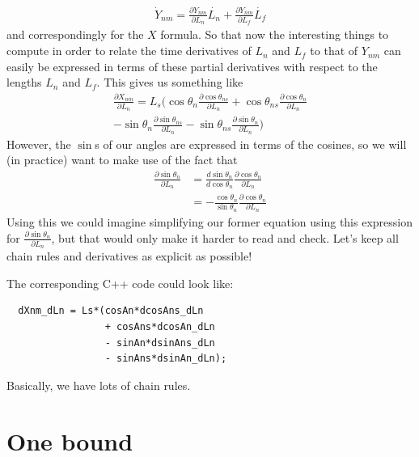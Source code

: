 \documentclass[11pt,twocolumn]{article}
\begin{document}
\begin{align}
  \dot{Y}_{nm} = \frac{\partial Y_{nm}}{\partial L_n} \dot{L_n}
  +  \frac{\partial Y_{nm}}{\partial L_{f}} \dot{L_{f}}
\end{align}
and correspondingly for the $X$ formula.  So that now the interesting
things to compute in order to relate the time derivatives of $L_n$ and
$L_f$ to that of $Y_{nm}$ can easily be expressed in terms of these
partial derivatives with respect to the lengths $L_n$ and $L_f$.  This
gives us something like
\begin{multline}
  \frac{\partial X_{nm}}{\partial L_n} = L_s\Bigg(
  \cos\theta_n\frac{\partial \cos\theta_{ns}}{\partial L_n}
  + \cos\theta_{ns}\frac{\partial \cos\theta_{n}}{\partial L_n} \\
  - \sin\theta_n\frac{\partial \sin\theta_{ns}}{\partial L_n}
  - \sin\theta_{ns}\frac{\partial \sin\theta_{n}}{\partial L_n}
  \Bigg)
\end{multline}
However, the $\sin$s of our angles are expressed in terms of the
cosines, so we will (in practice) want to make use of the fact that
\begin{align}
  \frac{\partial \sin\theta_{n}}{\partial L_n} &=
  \frac{d \sin\theta_{n}}{d \cos\theta_n}
  \frac{\partial \cos\theta_{n}}{\partial L_n} \\
  &=
  -\frac{\cos\theta_{n}}{\sin\theta_n}
  \frac{\partial \cos\theta_{n}}{\partial L_n}
\end{align}
Using this we could imagine simplifying our former equation using this
expression for $\frac{\partial \sin\theta_{n}}{\partial L_n}$, but
that would only make it harder to read and check.  Let's keep all
chain rules and derivatives as explicit as possible!

The
corresponding C++ code could look like:
\begin{verbatim}
  dXnm_dLn = Ls*(cosAn*dcosAns_dLn
                 + cosAns*dcosAn_dLn
                 - sinAn*dsinAns_dLn
                 - sinAns*dsinAn_dLn);
\end{verbatim}
Basically, we have lots of chain rules.

\section{One bound}
\end{document}
